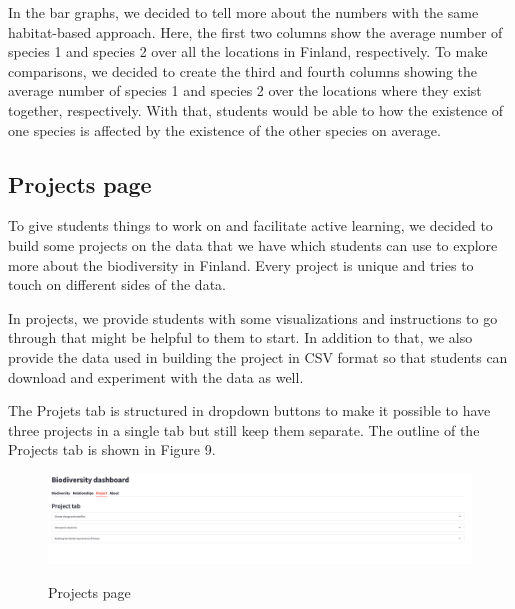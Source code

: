 \documentclass{article}
\begin{document}
\par
In the bar graphs, we decided to tell more about the numbers with the same habitat-based approach. Here, the first two columns show the average number of species 1 and species 2 over all the locations in Finland, respectively. To make comparisons, we decided to create the third and fourth columns showing the average number of species 1 and species 2 over the locations where they exist together, respectively. With that, students would be able to how the existence of one species is affected by the existence of the other species on average.
\subsection{Projects page}
To give students things to work on and facilitate active learning, we decided to build some projects on the data that we have which students can use to explore more about the biodiversity in Finland. Every project is unique and tries to touch on different sides of the data.
\par
In projects, we provide students with some visualizations and instructions to go through that might be helpful to them to start. In addition to that, we also provide the data used in building the project in CSV format so that students can download and experiment with the data as well.
\par
The Projets tab is structured in dropdown buttons to make it possible to have three projects in a single tab but still keep them separate. The outline of the Projects tab is shown in Figure 9.
\begin{figure}[h]
	\vspace*{-1mm}
	\centering
	\includegraphics[width=18cm]{projects_page}\label{projects_page}
	\vspace*{-2mm}
	\caption{Projects page}
\end{figure}
\end{document}
